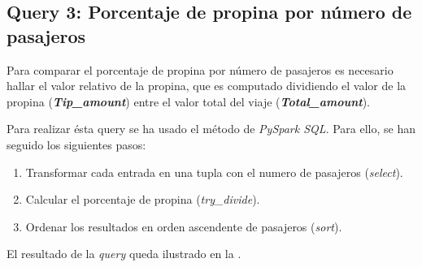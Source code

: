 



\subsection{Query 3: Porcentaje de propina por número de pasajeros}
Para comparar el porcentaje de propina por número de pasajeros es necesario hallar el valor relativo de la propina, que es computado dividiendo el valor de la propina (\textbf{\textit{Tip\_amount}}) entre el valor total del viaje (\textbf{\textit{Total\_amount}}). 

Para realizar ésta query se ha usado el método de \textit{PySpark SQL}. Para ello, se han seguido los siguientes pasos:
\begin{enumerate}
  \item Transformar cada entrada en una tupla con el numero de pasajeros (\textit{select}).
  \item Calcular el porcentaje de propina (\textit{try\_divide}).
  \item Ordenar los resultados en orden ascendente de pasajeros (\textit{sort}).
\end{enumerate}


\noindent
El resultado de la \textit{query} queda ilustrado en la .

